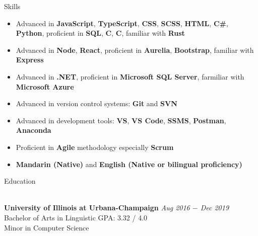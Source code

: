 \documentclass{resume}
\begin{document}
\begin{rSection}{Skills}

\begin{itemize}

    \item	Advanced in \textbf{JavaScript}, \textbf{TypeScript}, \textbf{CSS}, \textbf{SCSS}, \textbf{HTML}, \textbf{C\#}, \textbf{Python}, proficient in \textbf{SQL}, \textbf{C}, \textbf{C\boldsymbol{++}}, familiar with \textbf{Rust}
    \item	Advanced in \textbf{Node}, \textbf{React}, proficient in \textbf{Aurelia}, \textbf{Bootstrap}, familiar with \textbf{Express}
    \item	Advanced in \textbf{.NET}, proficient in \textbf{Microsoft SQL Server}, farmiliar with \textbf{Microsoft Azure}
    \item   Advanced in version control systems: \textbf{Git} and \textbf{SVN}
    \item	Advanced in development tools: \textbf{VS}, \textbf{VS Code}, \textbf{SSMS}, \textbf{Postman}, \textbf{Anaconda}
    \item	Proficient in \textbf{Agile} methodology especially \textbf{Scrum}
    \item   \textbf{Mandarin (Native)} and \textbf{English (Native or bilingual proficiency)}

\end{itemize}

\end{rSection}

\begin{rSection}{Education}

    \\{\bf University of Illinois at Urbana-Champaign} \hfill {\em Aug 2016 $-$ Dec 2019} 
    \\ Bachelor of Arts in Linguistic\hfill { GPA: 3.32 / 4.0 }
    \\ Minor in Computer Science

\end{rSection}
\end{document}
